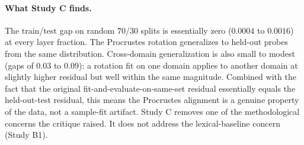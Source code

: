 \paragraph{What Study C finds.} The train/test gap on random $70$/$30$
splits is essentially zero ($0.0004$ to $0.0016$) at every layer
fraction. The Procrustes rotation generalizes to held-out probes from
the same distribution. Cross-domain generalization is also small to
modest (gaps of $0.03$ to $0.09$): a rotation fit on one domain
applies to another domain at slightly higher residual but well within
the same magnitude. Combined with the fact that the original
fit-and-evaluate-on-same-set residual essentially equals the
held-out-test residual, this means the Procrustes alignment is a
genuine property of the data, not a sample-fit artifact. Study C
removes one of the methodological concerns the critique raised. It
does not address the lexical-baseline concern (Study B1).
